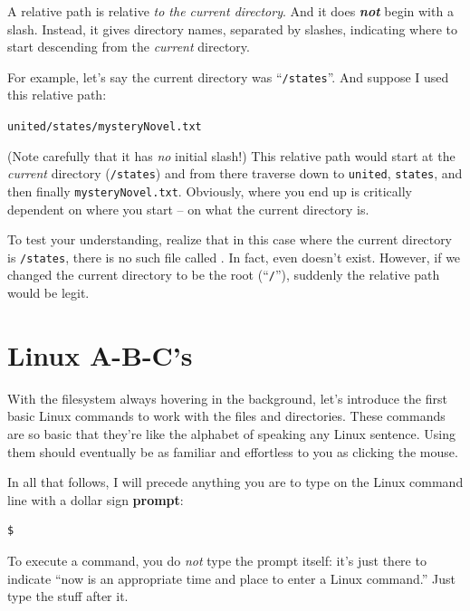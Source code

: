 A relative path is relative \textit{to the current directory}. And it does
\textit{\textbf{not}} begin with a slash. Instead, it gives directory names,
separated by slashes, indicating where to start descending from the
\textit{current} directory.

For example, let's say the current directory was ``\texttt{/states}''. And
suppose I used this relative path:

\quad\quad \texttt{united/states/mysteryNovel.txt}

(Note carefully that it has \textit{no} initial slash!) This relative path
would start at the \textit{current} directory (\texttt{/states}) and from there
traverse down to \texttt{united}, \texttt{states}, and then finally
\texttt{mysteryNovel.txt}. Obviously, where you end up is critically dependent
on where you start -- on what the current directory is.

To test your understanding, realize that in this case where the current
directory is \texttt{/states}, there is no such file called
. In fact, even 
 doesn't exist. However, if we changed the
current directory to be the root (``\texttt{/}''), suddenly the relative path
 would be legit.

\section{Linux A-B-C's}

With the filesystem always hovering in the background, let's introduce the
first basic Linux commands to work with the files and directories. These
commands are so basic that they're like the alphabet of speaking any Linux
sentence. Using them should eventually be as familiar and effortless to you as
clicking the mouse.

In all that follows, I will precede anything you are to type on the Linux
command line with a dollar sign \textbf{prompt}:

\begin{Verbatim}[fontsize=\small]
$
\end{Verbatim}

To execute a command, you do \textit{not} type the prompt itself: it's just
there to indicate ``now is an appropriate time and place to enter a Linux
command.'' Just type the stuff after it.


